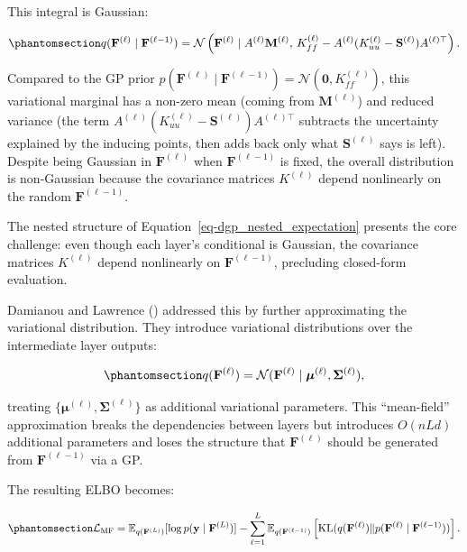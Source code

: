 \documentclass[
  letterpaper,
  DIV=11,
  numbers=noendperiod]{scrartcl}
\begin{document}
This integral is Gaussian:

\begin{equation}\phantomsection\label{eq-marginal_q_layer_explicit}{
q(\mathbf{F}^{(\ell)} \mid \mathbf{F}^{(\ell-1)}) = \mathcal{N}\left(\mathbf{F}^{(\ell)} \mid A^{(\ell)} \mathbf{M}^{(\ell)}, \, K^{(\ell)}_{ff} - A^{(\ell)}(K^{(\ell)}_{uu} - \mathbf{S}^{(\ell)})A^{(\ell)\top}\right).
}\end{equation}

Compared to the GP prior
\(p(\mathbf{F}^{(\ell)} \mid \mathbf{F}^{(\ell-1)}) = \mathcal{N}(\mathbf{0}, K^{(\ell)}_{ff})\),
this variational marginal has a non-zero mean (coming from
\(\mathbf{M}^{(\ell)}\)) and reduced variance (the term
\(A^{(\ell)}(K^{(\ell)}_{uu} - \mathbf{S}^{(\ell)})A^{(\ell)\top}\)
subtracts the uncertainty explained by the inducing points, then adds
back only what \(\mathbf{S}^{(\ell)}\) says is left). Despite being
Gaussian in \(\mathbf{F}^{(\ell)}\) when \(\mathbf{F}^{(\ell-1)}\) is
fixed, the overall distribution is non-Gaussian because the covariance
matrices \(K^{(\ell)}\) depend nonlinearly on the random
\(\mathbf{F}^{(\ell-1)}\).

The nested structure of Equation~\ref{eq-dgp_nested_expectation}
presents the core challenge: even though each layer's conditional is
Gaussian, the covariance matrices \(K^{(\ell)}\) depend nonlinearly on
\(\mathbf{F}^{(\ell-1)}\), precluding closed-form evaluation.

Damianou and Lawrence ()
addressed this by further approximating the variational distribution.
They introduce variational distributions over the intermediate layer
outputs:

\begin{equation}\phantomsection\label{eq-damianou_q_F}{
q(\mathbf{F}^{(\ell)}) = \mathcal{N}(\mathbf{F}^{(\ell)} \mid \boldsymbol{\mu}^{(\ell)}, \boldsymbol{\Sigma}^{(\ell)}),
}\end{equation}

treating \(\{\boldsymbol{\mu}^{(\ell)}, \boldsymbol{\Sigma}^{(\ell)}\}\)
as additional variational parameters. This ``mean-field'' approximation
breaks the dependencies between layers but introduces \(O(nLd)\)
additional parameters and loses the structure that
\(\mathbf{F}^{(\ell)}\) should be generated from
\(\mathbf{F}^{(\ell-1)}\) via a GP.

The resulting ELBO becomes:

\begin{equation}\phantomsection\label{eq-damianou_elbo}{
\mathcal{L}_{\text{MF}} = \mathbb{E}_{q(\mathbf{F}^{(L)})}[\log p(\mathbf{y} \mid \mathbf{F}^{(L)})] - \sum_{\ell=1}^{L} \mathbb{E}_{q(\mathbf{F}^{(\ell-1)})}\left[\operatorname{KL}(q(\mathbf{F}^{(\ell)}) \| p(\mathbf{F}^{(\ell)} \mid \mathbf{F}^{(\ell-1)}))\right].
}\end{equation}
\end{document}
